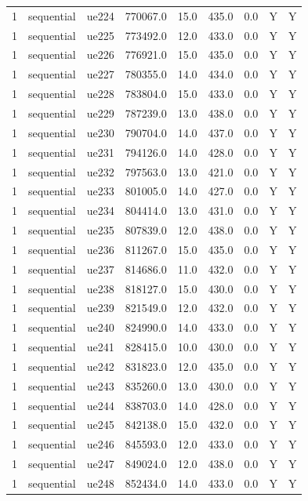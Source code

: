 \begin{table}[ht]
\begin{tabular}{|c|c|c|c|c|c|c|c|c|}
1 & sequential & ue224 & 770067.0 & 15.0 & 435.0 & 0.0 & Y & Y \\
1 & sequential & ue225 & 773492.0 & 12.0 & 433.0 & 0.0 & Y & Y \\
1 & sequential & ue226 & 776921.0 & 15.0 & 435.0 & 0.0 & Y & Y \\
1 & sequential & ue227 & 780355.0 & 14.0 & 434.0 & 0.0 & Y & Y \\
1 & sequential & ue228 & 783804.0 & 15.0 & 433.0 & 0.0 & Y & Y \\
1 & sequential & ue229 & 787239.0 & 13.0 & 438.0 & 0.0 & Y & Y \\
1 & sequential & ue230 & 790704.0 & 14.0 & 437.0 & 0.0 & Y & Y \\
1 & sequential & ue231 & 794126.0 & 14.0 & 428.0 & 0.0 & Y & Y \\
1 & sequential & ue232 & 797563.0 & 13.0 & 421.0 & 0.0 & Y & Y \\
1 & sequential & ue233 & 801005.0 & 14.0 & 427.0 & 0.0 & Y & Y \\
1 & sequential & ue234 & 804414.0 & 13.0 & 431.0 & 0.0 & Y & Y \\
1 & sequential & ue235 & 807839.0 & 12.0 & 438.0 & 0.0 & Y & Y \\
1 & sequential & ue236 & 811267.0 & 15.0 & 435.0 & 0.0 & Y & Y \\
1 & sequential & ue237 & 814686.0 & 11.0 & 432.0 & 0.0 & Y & Y \\
1 & sequential & ue238 & 818127.0 & 15.0 & 430.0 & 0.0 & Y & Y \\
1 & sequential & ue239 & 821549.0 & 12.0 & 432.0 & 0.0 & Y & Y \\
1 & sequential & ue240 & 824990.0 & 14.0 & 433.0 & 0.0 & Y & Y \\
1 & sequential & ue241 & 828415.0 & 10.0 & 430.0 & 0.0 & Y & Y \\
1 & sequential & ue242 & 831823.0 & 12.0 & 435.0 & 0.0 & Y & Y \\
1 & sequential & ue243 & 835260.0 & 13.0 & 430.0 & 0.0 & Y & Y \\
1 & sequential & ue244 & 838703.0 & 14.0 & 428.0 & 0.0 & Y & Y \\
1 & sequential & ue245 & 842138.0 & 15.0 & 432.0 & 0.0 & Y & Y \\
1 & sequential & ue246 & 845593.0 & 12.0 & 433.0 & 0.0 & Y & Y \\
1 & sequential & ue247 & 849024.0 & 12.0 & 438.0 & 0.0 & Y & Y \\
1 & sequential & ue248 & 852434.0 & 14.0 & 433.0 & 0.0 & Y & Y \\

\end{tabular}
\end{table}
